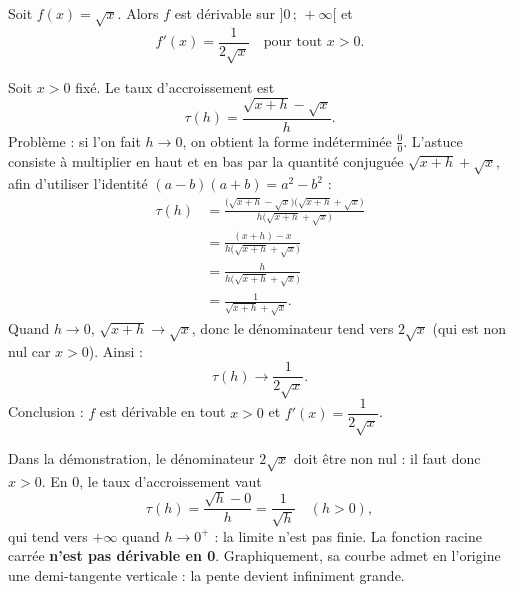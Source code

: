 \documentclass[11pt]{article}
\newcommand{\cle}[1]{{\popxbold\color{popdark}#1}}
\begin{document}
\begin{propriete}
Soit $f(x) = \sqrt{x}$. Alors $f$ est dérivable sur $]0\,;\,+\infty[$ et
\[
f'(x) = \frac{1}{2\sqrt{x}} \quad \text{pour tout } x > 0.
\]
\end{propriete}

\begin{experience}
Soit $x > 0$ fixé. Le taux d'accroissement est
\[
\tau(h) = \frac{\sqrt{x+h} - \sqrt{x}}{h}.
\]
Problème : si l'on fait $h \to 0$, on obtient la forme indéterminée $\frac{0}{0}$. L'astuce consiste à multiplier en haut et en bas par la \cle{quantité conjuguée} $\sqrt{x+h} + \sqrt{x}$, afin d'utiliser l'identité $(a-b)(a+b) = a^2 - b^2$ :
\begin{align*}
\tau(h) &= \frac{\big(\sqrt{x+h} - \sqrt{x}\big)\big(\sqrt{x+h} + \sqrt{x}\big)}{h\big(\sqrt{x+h} + \sqrt{x}\big)} \\
&= \frac{(x+h) - x}{h\big(\sqrt{x+h} + \sqrt{x}\big)} \\
&= \frac{h}{h\big(\sqrt{x+h} + \sqrt{x}\big)} \\
&= \frac{1}{\sqrt{x+h} + \sqrt{x}}.
\end{align*}
Quand $h \to 0$, $\sqrt{x+h} \to \sqrt{x}$, donc le dénominateur tend vers $2\sqrt{x}$ (qui est non nul car $x > 0$). Ainsi :
\[
\tau(h) \longrightarrow \frac{1}{2\sqrt{x}}.
\]
Conclusion : $f$ est dérivable en tout $x > 0$ et $f'(x) = \dfrac{1}{2\sqrt{x}}$.
\end{experience}

\begin{attention}[Pourquoi exclure $x = 0$ ?]
Dans la démonstration, le dénominateur $2\sqrt{x}$ doit être non nul : il faut donc $x > 0$. En $0$, le taux d'accroissement vaut
\[
\tau(h) = \frac{\sqrt{h} - 0}{h} = \frac{1}{\sqrt{h}} \quad (h > 0),
\]
qui tend vers $+\infty$ quand $h \to 0^+$ : la limite n'est pas finie. La fonction racine carrée \textbf{n'est pas dérivable en 0}. Graphiquement, sa courbe admet en l'origine une \cle{demi-tangente verticale} : la pente devient infiniment grande.
\end{attention}
\end{document}
